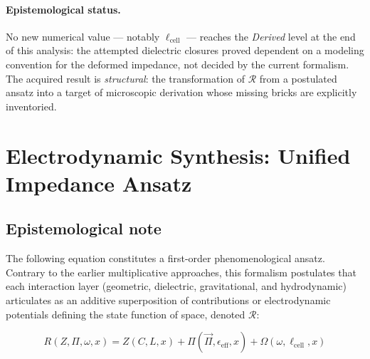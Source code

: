 \documentclass[11pt,a4paper]{article}
\theoremstyle{plain}
\theoremstyle{remark}
\begin{document}
\paragraph{Epistemological status.} No new numerical value --- notably $\ell_{\text{cell}}$ --- reaches the \emph{Derived} level at the end of this analysis: the attempted dielectric closures proved dependent on a modeling convention for the deformed impedance, not decided by the current formalism. The acquired result is \emph{structural}: the transformation of $\mathcal{R}$ from a postulated ansatz into a target of microscopic derivation whose missing bricks are explicitly inventoried.

\section{Electrodynamic Synthesis: Unified Impedance Ansatz}
\label{sec:electrodynamic_synthesis}

\subsection*{Epistemological note}
The following equation constitutes a first-order phenomenological ansatz. Contrary to the earlier multiplicative approaches, this formalism postulates that each interaction layer (geometric, dielectric, gravitational, and hydrodynamic) articulates as an additive superposition of contributions or electrodynamic potentials defining the state function of space, denoted $\mathcal{R}$:

\begin{equation}
\label{eq:additive_ansatz_global}
\boxed{R(Z, \Pi, \omega, x) = Z(C, L, x) + \Pi(\vec{\Pi}, \epsilon_{\text{eff}}, x) + \Omega(\omega, \ell_{\text{cell}}, x)}
\end{equation}
\end{document}
